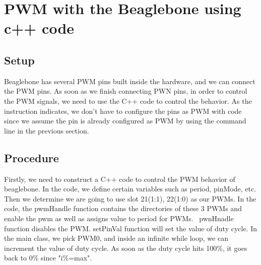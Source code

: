 \documentclass{article}
\begin{document}
\section{PWM with the Beaglebone using c++ code}
\subsection{Setup}
Beaglebone has several PWM pins built inside the hardware, and we can connect the PWM pins. As soon as we finish connecting PWN pins, in order to control the PWM signals, we need to use the C++ code to control the behavior. As the instruction indicates, we don’t have to configure the pins as PWM with code since we assume the pin is already configured as PWM by using the command line in the previous section. 
\subsection{Procedure}
Firstly, we need to construct a C++ code to control the PWM behavior of beaglebone. In the code, we define certain variables such as period, pinMode, etc. Then we determine we are going to use slot 21(1:1), 22(1:0) as our PWMs. In the code, the pwmHandle function contains the directories of these 3 PWMs and enable the pwm as well as assigns value to period for PWMs. ~pwnHnadle function disables the PWM. setPinVal function will set the value of duty cycle. 	In the main class, we pick PWM0, and inside an infinite while loop, we can increment the value of duty cycle. As soon as the duty cycle hits 100\%, it goes back to 0\% since "i\%=max".
\end{document}
